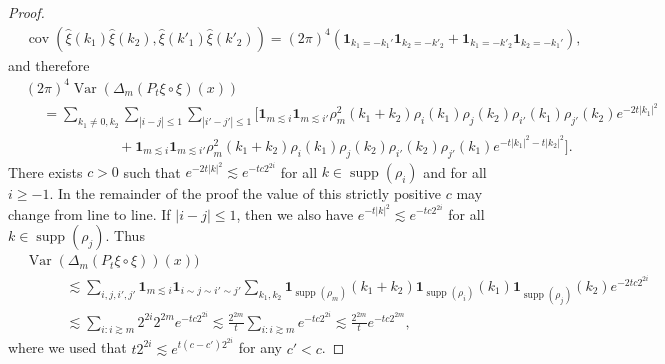 \documentclass[a4paper,11pt]{article}
\newcommand{\tmop}[1]{\ensuremath{\operatorname{#1}}}
\theoremstyle{remark}
\newcommand{\reso}{\,\mathord{\circ}\,}
\begin{document}
\begin{proof}
   \begin{align*}
      &\tmop{cov} ( \widehat{\xi} ( k_1 ) \widehat{\xi} (k_2), \widehat{\xi} ( k'_1 ) \widehat{\xi} (k'_2)) = ( 2 \pi )^4 ( \mathbf{1}_{k_1=-k_1'} \mathbf{1}_{k_2 = - k'_2} + \mathbf{1}_{k_1 = - k'_2} \mathbf{1}_{k_2 = - k_1'} ),
   \end{align*}
   and therefore
   \begin{align*}
      &(2\pi)^{4} \tmop{Var} ( \Delta_m ( P_t \xi\reso \xi ) ( x ) ) \\
      &\hspace{15pt}=  \sum_{k_1 \neq 0, k_2} \sum_{| i - j|\leqslant 1} \sum_{| i' - j'| \leqslant 1} \Big[ \mathbf{1}_{m \lesssim i} \mathbf{1}_{m \lesssim i'} \rho^2_m(k_1 + k_2) \rho_i ( k_1 ) \rho_j ( k_2 )\rho_{i'} ( k_1 ) \rho_{j'} ( k_2 ) e^{- 2 t |k_1 |^2}\\
      &\hspace{80pt} + \mathbf{1}_{m \lesssim i} \mathbf{1}_{m \lesssim i'} \rho^2_m (k_1 + k_2 ) \rho_i ( k_1 ) \rho_j ( k_2 ) \rho_{i'} ( k_2 ) \rho_{j'} ( k_1 ) e^{- t |k_1 |^2 - t | k_2 |^2} \Big].
   \end{align*}
   There exists $c > 0$ such that $e^{- 2 t | k|^2} \lesssim e^{- t c 2^{2 i}}$ for all $k \in \tmop{supp} ( \rho_i )$ and for all $i \geqslant -1$. In the  remainder of the proof the value of this strictly positive $c$ may change from line to line. If $| i - j | \leqslant 1$, then we also have $e^{- t | k |^2} \lesssim e^{- t c 2^{2 i}}$ for all $k \in \tmop{supp} ( \rho_j )$. Thus
   \begin{align}\label{e:anderson area var}\nonumber
      & \tmop{Var} ( \Delta_m  ( P_t \xi \reso \xi )) ( x ) )\\ \nonumber
      &\hspace{35pt} \lesssim \sum_{i, j, i', j'} \mathbf{1}_{m \lesssim i} \mathbf{1}_{i \sim j \sim i' \sim j'} \sum_{k_1, k_2} \mathbf{1}_{\tmop{supp}(\rho_m)}(k_1 + k_2) \mathbf{1}_{\tmop{supp}( \rho_i )}(k_1) \mathbf{1}_{\tmop{supp} ( \rho_j)}(k_2) e^{- 2 t c 2^{2 i}} \\
      &\hspace{35pt} \lesssim \sum_{i:i \gtrsim m} 2^{2 i} 2^{2 m} e^{- t c 2^{2 i}} \lesssim \frac{2^{2 m}}{t} \sum_{i: i \gtrsim m} e^{- t c 2^{2 i}} \lesssim \frac{2^{2 m}}{t} e^{- t c 2^{2 m}},
   \end{align}
   where we used that $t 2^{2 i} \lesssim e^{t ( c - c' ) 2^{2 i}}$ for any $c' < c$.
   

\end{proof}
\end{document}
